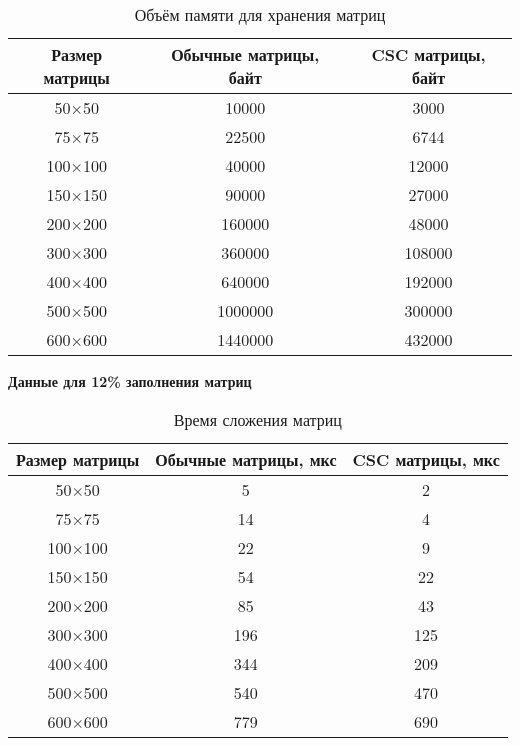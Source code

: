 \begin{table}[H]
	\centering
	\caption{Объём памяти для хранения матриц}
	\begin{tabular}{|c|c|c|}
		\hline
		Размер матрицы & Обычные матрицы, байт & CSC матрицы, байт \\ \hline
		50$\times$50         & 10000                 & 3000             \\ \hline
		75$\times$75         & 22500                 & 6744             \\ \hline
		100$\times$100        & 40000                 & 12000            \\ \hline
		150$\times$150        & 90000                 & 27000            \\ \hline
		200$\times$200        & 160000                & 48000            \\ \hline
		300$\times$300        & 360000                & 108000           \\ \hline
		400$\times$400        & 640000                & 192000           \\ \hline
		500$\times$500        & 1000000               & 300000           \\ \hline
		600$\times$600        & 1440000               & 432000           \\ \hline
	\end{tabular}
\end{table}


\newpage
\textbf{Данные для 12\% заполнения матриц}
\begin{table}[H]
	\centering
	\caption{Время сложения матриц}
	\begin{tabular}{|c|c|c|}
		\hline
		Размер матрицы & Обычные матрицы, мкс & CSC матрицы, мкс \\ \hline
		50$\times$50         & 5                    & 2                \\ \hline
		75$\times$75         & 14                   & 4                \\ \hline
		100$\times$100        & 22                   & 9                \\ \hline
		150$\times$150        & 54                   & 22               \\ \hline
		200$\times$200        & 85                   & 43               \\ \hline
		300$\times$300        & 196                  & 125              \\ \hline
		400$\times$400        & 344                  & 209              \\ \hline
		500$\times$500        & 540                  & 470              \\ \hline
		600$\times$600        & 779                  & 690              \\ \hline
	\end{tabular}
\end{table}


